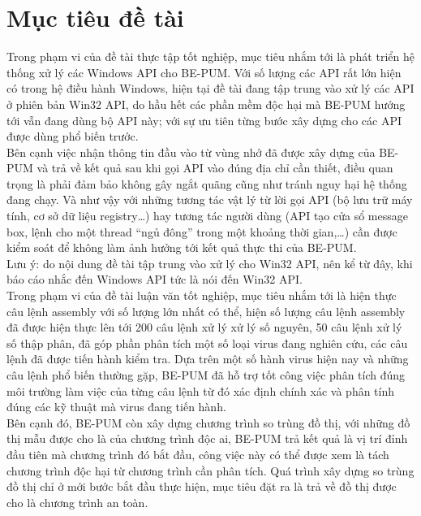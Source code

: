 \section{Mục tiêu đề tài}

Trong phạm vi của đề tài thực tập tốt nghiệp, mục tiêu nhắm tới là phát triển hệ thống xử lý các Windows API cho BE-PUM. Với số lượng các API rất lớn hiện có trong hệ điều hành Windows, hiện tại đề tài đang tập trung vào xử lý các API ở phiên bản Win32 API, do hầu hết các phần mềm độc hại mà BE-PUM hướng tới vẫn đang dùng bộ API này; với sự ưu tiên từng bước xây dựng cho các API được dùng phổ biến trước.\\

Bên cạnh việc nhận thông tin đầu vào từ vùng nhớ đã được xây dựng của BE-PUM và trả về kết quả sau khi gọi API vào đúng địa chỉ cần thiết, điều quan trọng là phải đảm bảo không gây ngắt quãng cũng như tránh nguy hại hệ thống đang chạy.
Và như vậy với những tương tác vật lý từ lời gọi API (bộ lưu trữ máy tính, cơ sở dữ liệu registry…) hay tương tác người dùng (API tạo cửa sổ message box, lệnh cho một thread “ngủ đông” trong một khoảng thời gian,…) cần được kiểm soát để không làm ảnh hưởng tới kết quả thực thi của BE-PUM.\\

Lưu ý: do nội dung đề tài tập trung vào xử lý cho Win32 API, nên kể từ đây, khi báo cáo nhắc đến Windows API tức là nói đến Win32 API.\\

Trong phạm vi của đề tài luận văn tốt nghiệp, mục tiêu nhắm tới là hiện thực câu lệnh assembly với số lượng lớn nhất có thể, hiện số lượng câu lệnh assembly đã được hiện thực lên tới 200 câu lệnh xử lý xử lý số nguyên, 50 câu lệnh xử lý số thập phân, đã góp phần phân tích một số loại virus đang nghiên cứu, các câu lệnh đã được tiến hành kiểm tra. Dựa trên một số hành virus hiện nay và những câu lệnh phổ biến thường gặp, BE-PUM đã hỗ trợ tốt công việc phân tích đúng môi trường làm việc của từng câu lệnh từ đó xác định chính xác và phân tính đúng các kỹ thuật mà virus đang tiến hành.\\

Bên cạnh đó, BE-PUM còn xây dựng chương trình so trùng đồ thị, với những đồ thị mẫu được cho là của chương trình độc ai, BE-PUM trả kết quả là vị trí đỉnh đầu tiên mà chương trình đó bắt đầu, công việc này có thể được xem là tách chương trình độc hại từ chương trình cần phân tích. Quá trình xây dựng so trùng đồ thị chỉ ở mới bước bắt đầu thực hiện, mục tiêu đặt ra là trả về đồ thị được cho là chương trình an toàn.\\

